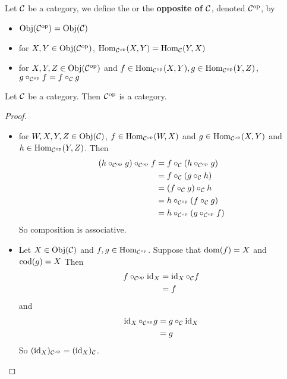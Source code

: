 \documentclass{book}
\begin{document}
	\begin{defn}  
		Let $\MC$ be a category, we define the  or the \textbf{opposite of $\MC$}, denoted $\op{C}$, by 
		\begin{itemize}
			\item $\Obj(\op{C}) = \Obj(\MC)$
			\item for $X,Y \in \Obj(\op{C})$, $\Hom_{\op{C}}(X,Y) = \Hom_{\MC}(Y,X)$
			\item for $X, Y, Z \in \Obj(\op{C})$ and $f \in \Hom_{\op{C}}(X, Y), g \in \Hom_{\op{C}}(Y,Z)$, $g \circ_{\op{C}} f = f \circ_{\MC} g$
		\end{itemize}
	\end{defn}

	\begin{ex}  
		Let $\MC$ be a category. Then $\op{C}$ is a category.
	\end{ex}
	
	\begin{proof}\
		\begin{itemize}
			\item for $W,X,Y,Z \in \Obj(\MC)$, $f \in \Hom_{\op{C}}(W, X)$ and $g \in \Hom_{\op{C}}(X, Y)$ and $h \in \Hom_{\op{C}}(Y, Z)$. Then 
			\begin{align*}
				(h \circ_{\op{C}} g) \circ_{\op{C}} f 
				&= f \circ_{\MC}( h \circ_{\op{C}} g) \\
				&= f \circ_{\MC} (g \circ_{\MC} h) \\
				&= (f \circ_{\MC} g) \circ_{\MC} h \\
				&= h \circ_{\op{C}} (f \circ_{\MC} g) \\
				&= h \circ_{\op{C}} (g \circ_{\op{C}} f)
			\end{align*}
			So composition is associative.
			\item Let $X \in \Obj(\MC)$ and $f,g \in \Hom_{\op{C}}$. Suppose that $\dom(f) = X$ and $\cod(g) = X$ 
			Then 
			\begin{align*}
				f  \circ_{\op{C}} \id_X
				&= \id_X  \circ_{\MC} f \\
				&= f
			\end{align*}
			and 
			\begin{align*}
				\id_X  \circ_{\op{C}} g 
				&= g \circ_{\MC} \id_X \\
				&= g
			\end{align*}
		So $(\id_X)_{\op{C}} =  (\id_X)_{\MC}$.
		\end{itemize}
	\end{proof}
\end{document}
